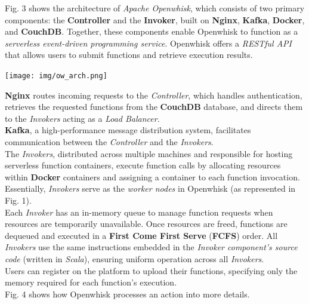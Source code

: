 Fig. 3 shows the architecture of \textit{Apache Openwhisk}, which consists of two primary components: the \textbf{Controller} and the \textbf{Invoker}, built on \textbf{Nginx}, \textbf{Kafka}, \textbf{Docker}, and \textbf{CouchDB}. Together, these components enable Openwhisk to function as a \textit{serverless event-driven programming service}. Openwhisk offers a \textit{RESTful API} that allows users to submit functions and retrieve execution results.\vspace{10pt}
\begin{center}
    \texttt{[image: img/ow\_arch.png]}
    \vspace{10pt}
\end{center}
\textbf{Nginx} routes incoming requests to the \textit{Controller}, which handles authentication, retrieves the requested functions from the \textbf{CouchDB} database, and directs them to the \textit{Invokers} acting as a \textit{Load Balancer}.\vspace{14pt}\\
\textbf{Kafka}, a high-performance message distribution system, facilitates communication between the \textit{Controller} and the \textit{Invokers}.\vspace{14pt}\\
The \textit{Invokers}, distributed across multiple machines and responsible for hosting serverless function containers, execute function calls by allocating resources within \textbf{Docker} containers and assigning a container to each function invocation. Essentially, \textit{Invokers} serve as the \textit{worker nodes} in Openwhisk (as represented in Fig. 1).\vspace{14pt}\\
Each \textit{Invoker} has an in-memory queue to manage function requests when resources are temporarily unavailable. Once resources are freed, functions are dequeued and executed in a \textbf{First Come First Serve} (\textbf{FCFS}) order. All \textit{Invokers} use the same instructions embedded in the \textit{Invoker component's source code} (written in \textit{Scala}), ensuring uniform operation across all \textit{Invokers}.\vspace{14pt}\\
Users can register on the platform to upload their functions, specifying only the memory required for each function's execution.\cite{banaei2022etas}\vspace{14pt}\\
Fig. 4 shows how Openwhisk processes an action into more details.\cite{sciabarra2019learning}\vspace{10pt}
